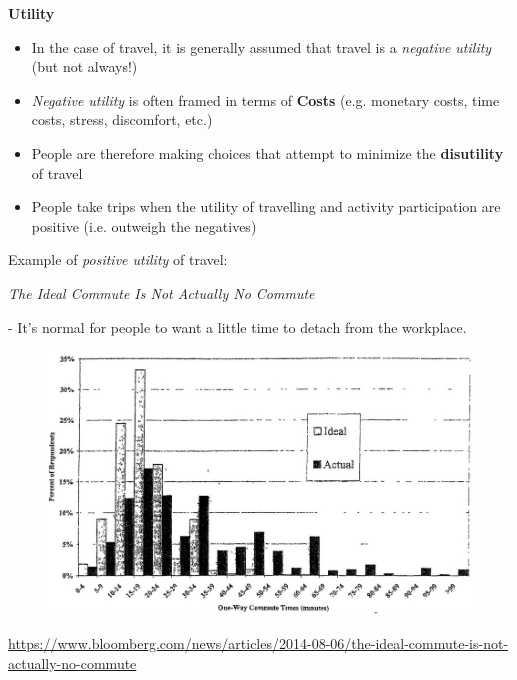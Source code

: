 \documentclass[aspectratio=169]{beamer}
\begin{document}
\begin{frame}
	
	\textbf{Utility}
	\vspace{4mm}
	
	\begin{itemize}
		\item In the case of travel, it is generally assumed that travel is a	\textit{negative utility} (but not always!)
		
		\item \textit{Negative utility} is often framed in terms of \textbf{Costs} (e.g. monetary costs, time costs, stress, discomfort, etc.)
		
		\item People are therefore making choices that attempt to
		minimize the \textbf{disutility} of travel
		
		\item People take trips when the utility of travelling and activity participation are positive (i.e. outweigh the negatives)
	\end{itemize}
	
\end{frame}





\begin{frame}
	
	Example of \textit{positive utility} of travel:
	
	\vspace{3mm}
	
	\textit{The Ideal Commute Is Not Actually No Commute}
	
	- It's normal for people to want a little time to detach from the workplace.
	
	\begin{figure}
		\centering
		\includegraphics[width=0.7\linewidth]{images/commute_ideal.png}
	\end{figure}
	\tiny\url{https://www.bloomberg.com/news/articles/2014-08-06/the-ideal-commute-is-not-actually-no-commute}
	
	
\end{frame}
\end{document}
